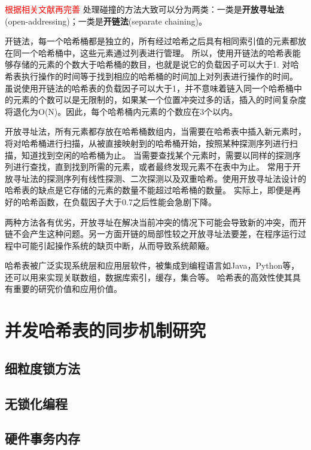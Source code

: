 \textcolor{red}{根据相关文献再完善}
处理碰撞的方法大致可以分为两类：一类是\textbf{开放寻址法}(open-addressing)；一类是\textbf{开链法}(separate chaining)。

开链法，每一个哈希桶都是独立的，所有经过哈希之后具有相同索引值的元素都放在同一个哈希桶中，这些元素通过列表进行管理。
所以，使用开链法的哈希表能够存储的元素的个数大于哈希桶的数目，也就是说它的负载因子可以大于1.
对哈希表执行操作的时间等于找到相应的哈希桶的时间加上对列表进行操作的时间。
虽说使用开链法的哈希表的负载因子可以大于1，并不意味着链入同一个哈希桶中的元素的个数可以是无限制的，如果某一个位置冲突过多的话，插入的时间复杂度将退化为O(N)。因此，每个哈希桶内元素的个数应在3个以内。

开放寻址法，所有元素都存放在哈希桶数组内，当需要在哈希表中插入新元素时，将对哈希桶进行扫描，从被直接映射到的哈希桶开始，按照某种探测序列进行扫描，知道找到空闲的哈希桶为止。
当需要查找某个元素时，需要以同样的探测序列进行查找，直到找到所需的元素，或者最终发现元素不在表中为止。
常用于开放寻址法的探测序列有线性探测、二次探测以及双重哈希。使用开放寻址法设计的哈希表的缺点是它存储的元素的数量不能超过哈希桶的数量。
实际上，即便是再好的哈希函数，在负载因子大于0.7之后性能会急剧下降。

两种方法各有优劣，开放寻址在解决当前冲突的情况下可能会导致新的冲突，而开链不会产生这种问题。另一方面开链的局部性较之开放寻址法要差，在程序运行过程中可能引起操作系统的缺页中断，从而导致系统颠簸。

哈希表被广泛实现系统层和应用层软件，被集成到编程语言如Java，Python等，还可以用来实现关联数组，数据库索引，缓存，集合等。
哈希表的高效性使其具有重要的研究价值和应用价值。

\section{并发哈希表的同步机制研究}

\subsection{细粒度锁方法}

\subsection{无锁化编程}

\subsection{硬件事务内存}

